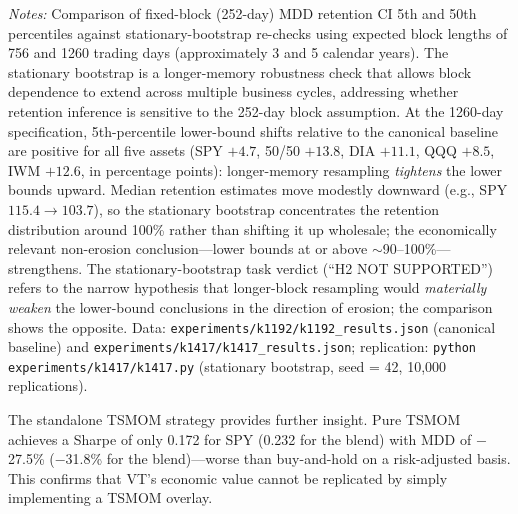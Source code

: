 \begin{table}[H]
\begin{threeparttable}
\begin{tablenotes}
\item \textit{Notes:} Comparison of fixed-block (252-day) MDD retention CI 5th and 50th percentiles against stationary-bootstrap re-checks using expected block lengths of 756 and 1260 trading days (approximately 3 and 5 calendar years). The stationary bootstrap is a longer-memory robustness check that allows block dependence to extend across multiple business cycles, addressing whether retention inference is sensitive to the 252-day block assumption. At the 1260-day specification, 5th-percentile lower-bound shifts relative to the canonical baseline are positive for all five assets (SPY $+4.7$, 50/50 $+13.8$, DIA $+11.1$, QQQ $+8.5$, IWM $+12.6$, in percentage points): longer-memory resampling \emph{tightens} the lower bounds upward. Median retention estimates move modestly downward (e.g., SPY $115.4 \to 103.7$), so the stationary bootstrap concentrates the retention distribution around 100\% rather than shifting it up wholesale; the economically relevant non-erosion conclusion---lower bounds at or above $\sim$90--100\%---strengthens. The stationary-bootstrap task verdict (``H2 NOT SUPPORTED'') refers to the narrow hypothesis that longer-block resampling would \emph{materially weaken} the lower-bound conclusions in the direction of erosion; the comparison shows the opposite. Data: \texttt{experiments/k1192/k1192\_results.json} (canonical baseline) and \texttt{experiments/k1417/k1417\_results.json}; replication: \texttt{python experiments/k1417/k1417.py} (stationary bootstrap, seed = 42, 10{,}000 replications).
\end{tablenotes}
\end{threeparttable}
\end{table}

The standalone TSMOM strategy provides further insight. Pure TSMOM achieves a Sharpe of only 0.172 for SPY (0.232 for the blend) with MDD of $-$27.5\% ($-$31.8\% for the blend)---worse than buy-and-hold on a risk-adjusted basis. This confirms that VT's economic value cannot be replicated by simply implementing a TSMOM overlay.

